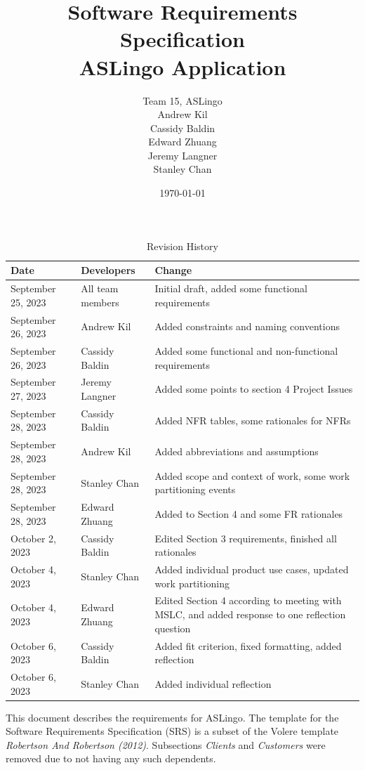 \documentclass[12pt, titlepage]{article}
\title{Software Requirements Specification\\ASLingo Application}
\author{Team 15, ASLingo
		\\ Andrew Kil
		\\ Cassidy Baldin
		\\ Edward Zhuang
		\\ Jeremy Langner
		\\ Stanley Chan
}
\date{\today}
\begin{document}
\maketitle

\tableofcontents
\listoftables
\listoffigures

\begin{table}[H]
\caption{Revision History}
\begin{tabularx}{\textwidth}{|l|l|X|}
\hline {\bf Date} & {\bf Developers} & {\bf Change}\\
\hline
September 25, 2023 & All team members & Initial draft, added some functional requirements \\
September 26, 2023 & Andrew Kil & Added constraints and naming conventions \\
September 26, 2023 & Cassidy Baldin & Added some functional and non-functional requirements \\
September 27, 2023 & Jeremy Langner & Added some points to section 4 Project Issues \\
September 28, 2023 & Cassidy Baldin & Added NFR tables, some rationales for NFRs \\
September 28, 2023 & Andrew Kil & Added abbreviations and assumptions \\
September 28, 2023 & Stanley Chan & Added scope and context of work, some work partitioning events \\
September 28, 2023 & Edward Zhuang & Added to Section 4 and some FR rationales \\
October 2, 2023 & Cassidy Baldin & Edited Section 3 requirements, finished all rationales \\
October 4, 2023 & Stanley Chan & Added individual product use cases, updated work partitioning \\
October 4, 2023 & Edward Zhuang & Edited Section 4 according to meeting with MSLC, and added response to one reflection question \\
October 6, 2023 & Cassidy Baldin & Added fit criterion, fixed formatting, added reflection \\
October 6, 2023 & Stanley Chan & Added individual reflection \\
\bottomrule
\end{tabularx}
\end{table}

\newpage


This document describes the requirements for ASLingo. The template for the Software
Requirements Specification (SRS) is a subset of the Volere
template \textit{Robertson And Robertson (2012)}.  Subsections \textit{Clients} and \textit{Customers} were removed due to not having any such dependents.
\end{document}
